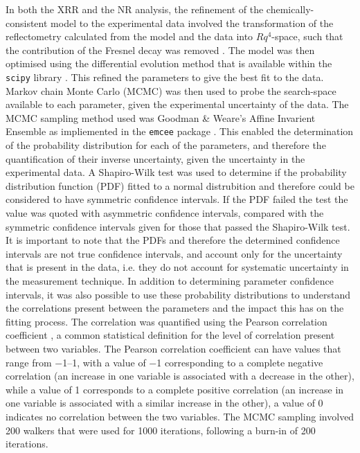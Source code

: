 In both the XRR and the NR analysis, the refinement of the chemically-consistent model to the experimental data involved the transformation of the reflectometry calculated from the model and the data into $Rq^4$-space, such that the contribution of the Fresnel decay was removed \cite{gerelli_aurore_2016}.
The model was then optimised using the differential evolution method that is available within the \texttt{scipy} library \cite{jones_scipy_nodate}.
This refined the parameters to give the best fit to the data.
Markov chain Monte Carlo (MCMC) was then used to probe the search-space available to each parameter, given the experimental uncertainty of the data.
The MCMC sampling method used was Goodman \& Weare's Affine Invarient Ensemble \cite{goodman_ensemble_2010} as impliemented in the \texttt{emcee} package \cite{foreman-mackey_emcee_2013}.
This enabled the determination of the probability distribution for each of the parameters, and therefore the quantification of their inverse uncertainty, given the uncertainty in the experimental data.
A Shapiro-Wilk test \cite{shapiro_analysis_1965} was used to determine if the probability distribution function (PDF) fitted to a normal distrubition and therefore could be considered to have symmetric confidence intervals.
If the PDF failed the test the value was quoted with asymmetric confidence intervals, compared with the symmetric confidence intervals given for those that passed the Shapiro-Wilk test.
It is important to note that the PDFs and therefore the determined confidence intervals are not true confidence intervals, and account only for the uncertainty that is present in the data, i.e. they do not account for systematic uncertainty in the measurement technique.
In addition to determining parameter confidence intervals, it was also possible to use these probability distributions to understand the correlations present between the parameters and the impact this has on the fitting process.
The correlation was quantified using the Pearson correlation coefficient \cite{pearson_notes_1895}, a common statistical definition for the level of correlation present between two variables.
The Pearson correlation coefficient can have values that range from \numrange{-1}{1}, with a value of \num{-1} corresponding to a complete negative correlation (an increase in one variable is associated with a decrease in the other), while a value of \num{1} corresponds to a complete positive correlation (an increase in one variable is associated with a similar increase in the other), a value of \num{0} indicates no correlation between the two variables.
The MCMC sampling involved 200 walkers that were used for 1000 iterations, following a burn-in of 200 iterations.
